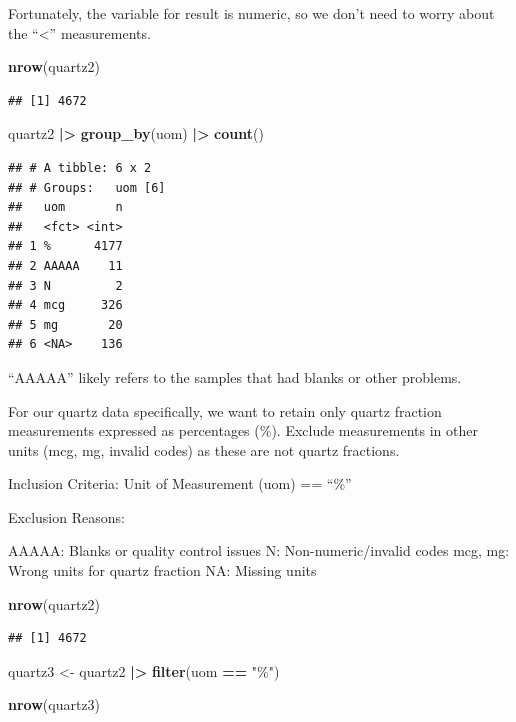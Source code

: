 \documentclass[
]{article}
\newenvironment{Shaded}{\begin{snugshade}}{\end{snugshade}}
\newcommand{\FunctionTok}[1]{\textcolor[rgb]{0.13,0.29,0.53}{\textbf{#1}}}
\newcommand{\NormalTok}[1]{#1}
\newcommand{\OtherTok}[1]{\textcolor[rgb]{0.56,0.35,0.01}{#1}}
\newcommand{\SpecialCharTok}[1]{\textcolor[rgb]{0.81,0.36,0.00}{\textbf{#1}}}
\newcommand{\StringTok}[1]{\textcolor[rgb]{0.31,0.60,0.02}{#1}}
\begin{document}
Fortunately, the variable for result is numeric, so we don't need to
worry about the ``\textless{}'' measurements.

\begin{Shaded}
\begin{Highlighting}[]
\FunctionTok{nrow}\NormalTok{(quartz2)}
\end{Highlighting}
\end{Shaded}

\begin{verbatim}
## [1] 4672
\end{verbatim}

\begin{Shaded}
\begin{Highlighting}[]
\NormalTok{quartz2 }\SpecialCharTok{|\textgreater{}} 
  \FunctionTok{group\_by}\NormalTok{(uom) }\SpecialCharTok{|\textgreater{}} 
  \FunctionTok{count}\NormalTok{() }
\end{Highlighting}
\end{Shaded}

\begin{verbatim}
## # A tibble: 6 x 2
## # Groups:   uom [6]
##   uom       n
##   <fct> <int>
## 1 %      4177
## 2 AAAAA    11
## 3 N         2
## 4 mcg     326
## 5 mg       20
## 6 <NA>    136
\end{verbatim}

``AAAAA'' likely refers to the samples that had blanks or other
problems.

For our quartz data specifically, we want to retain only quartz fraction
measurements expressed as percentages (\%). Exclude measurements in
other units (mcg, mg, invalid codes) as these are not quartz fractions.

Inclusion Criteria: Unit of Measurement (uom) == ``\%''

Exclusion Reasons:

AAAAA: Blanks or quality control issues N: Non-numeric/invalid codes
mcg, mg: Wrong units for quartz fraction NA: Missing units

\begin{Shaded}
\begin{Highlighting}[]
\FunctionTok{nrow}\NormalTok{(quartz2) }
\end{Highlighting}
\end{Shaded}

\begin{verbatim}
## [1] 4672
\end{verbatim}

\begin{Shaded}
\begin{Highlighting}[]
\NormalTok{quartz3 }\OtherTok{\textless{}{-}}\NormalTok{ quartz2 }\SpecialCharTok{|\textgreater{}} 
  \FunctionTok{filter}\NormalTok{(uom }\SpecialCharTok{==} \StringTok{"\%"}\NormalTok{) }

\FunctionTok{nrow}\NormalTok{(quartz3)}
\end{Highlighting}
\end{Shaded}
\end{document}
